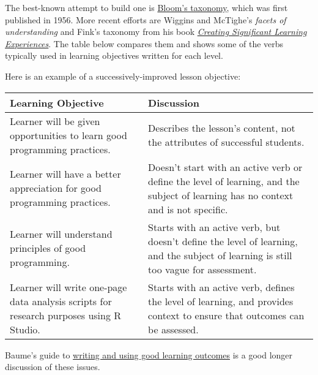 The best-known attempt to build one is
\href{https://en.wikipedia.org/wiki/Bloom's\_taxonomy}{Bloom's taxonomy},
which was first published in 1956.
More recent efforts are Wiggins and McTighe's \emph{facets of understanding}
and Fink's taxonomy from his book
\emph{\href{http://www.amazon.com/Creating-Significant-Learning-Experiences-Integrated/dp/1118124251/}{Creating Significant Learning Experiences}}.
The table below compares them and shows some of the verbs typically used
in learning objectives written for each level.

Here is an example of a successively-improved lesson objective:

\begin{longtable}{|l|l|}
\hline
Learning Objective & Discussion\\
\hline
Learner will be given opportunities to learn good programming practices. & Describes the lesson's content, not the attributes of successful students.\\
Learner will have a better appreciation for good programming practices. & Doesn't start with an active verb or define the level of learning, and the subject of learning has no context and is not specific.\\
Learner will understand principles of good programming. & Starts with an active verb, but doesn't define the level of learning, and the subject of learning is still too vague for assessment.\\
Learner will write one-page data analysis scripts for research purposes using R Studio. & Starts with an active verb, defines the level of learning, and provides context to ensure that outcomes can be assessed.\\
\hline
\end{longtable}

Baume's guide to
\href{\{\{ page.root \}\}/files/papers/baume-learning-outcomes-2009.pdf}{writing and using good learning outcomes}
is a good longer discussion of these issues.


